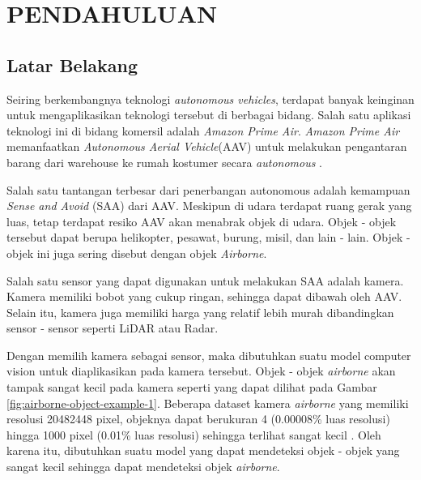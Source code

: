 \section{PENDAHULUAN}
\subsection{Latar Belakang}
    Seiring berkembangnya teknologi \emph{autonomous vehicles}, terdapat banyak keinginan untuk mengaplikasikan teknologi tersebut di berbagai bidang.
    Salah satu aplikasi teknologi ini di bidang komersil adalah \emph{Amazon Prime Air}.
    \emph{Amazon Prime Air} memanfaatkan \emph{Autonomous Aerial Vehicle}(AAV) untuk melakukan pengantaran barang dari warehouse ke rumah kostumer secara \emph{autonomous} \parencite{prime_air}.

    Salah satu tantangan terbesar dari penerbangan autonomous adalah kemampuan \emph{Sense and Avoid} (SAA) dari AAV.
    Meskipun di udara terdapat ruang gerak yang luas, tetap terdapat resiko AAV akan menabrak objek di udara.
    Objek - objek tersebut dapat berupa helikopter, pesawat, burung, misil, dan lain - lain.
    Objek - objek ini juga sering disebut dengan objek \emph{Airborne}\parencite{aot_docs}.

    Salah satu sensor yang dapat digunakan untuk melakukan SAA adalah kamera.
    Kamera memiliki bobot yang cukup ringan, sehingga dapat dibawah oleh AAV.
    Selain itu, kamera juga memiliki harga yang relatif lebih murah dibandingkan sensor - sensor seperti LiDAR atau Radar.
 
    Dengan memilih kamera sebagai sensor, maka dibutuhkan suatu model computer vision untuk diaplikasikan pada kamera tersebut.
    Objek - objek \emph{airborne} akan tampak sangat kecil pada kamera seperti yang dapat dilihat pada Gambar \ref{fig:airborne-object-example-1}.
    Beberapa dataset kamera \emph{airborne} yang memiliki resolusi 20482448 pixel, objeknya dapat berukuran 4 (0.00008\% luas resolusi) hingga 1000 pixel (0.01\% luas resolusi) sehingga terlihat sangat kecil \parencite{aot_dataset}.
    Oleh karena itu, dibutuhkan suatu model yang dapat mendeteksi objek - objek yang sangat kecil sehingga dapat mendeteksi objek \emph{airborne}.

